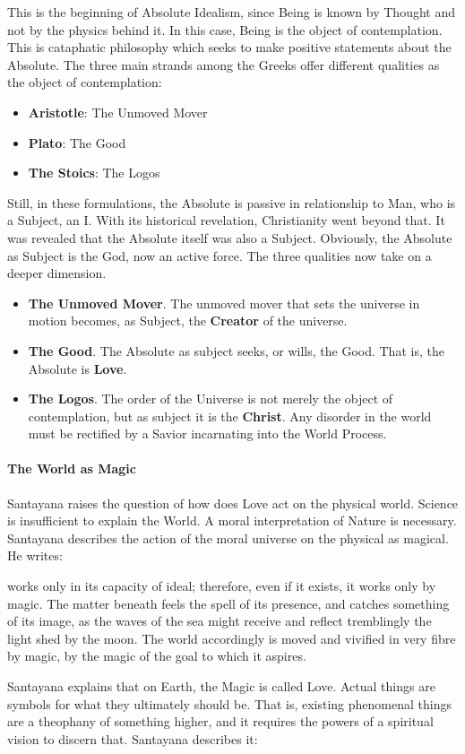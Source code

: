 This is the beginning of Absolute Idealism, since Being is known by Thought and not by the physics behind it. In this case, Being is the object of contemplation. This is cataphatic philosophy which seeks to make positive statements about the Absolute. The three main strands among the Greeks offer different qualities as the object of contemplation:

\begin{itemize}
\item \textbf{Aristotle}: The Unmoved Mover 
\item \textbf{Plato}: The Good 
\item \textbf{The Stoics}: The Logos 
\end{itemize}
Still, in these formulations, the Absolute is passive in relationship to Man, who is a Subject, an I. With its historical revelation, Christianity went beyond that. It was revealed that the Absolute itself was also a Subject. Obviously, the Absolute as Subject is the God, now an active force. The three qualities now take on a deeper dimension.

\begin{itemize}
\item \textbf{The Unmoved Mover}. The unmoved mover that sets the universe in motion becomes, as Subject, the \textbf{Creator} of the universe. 
\item \textbf{The Good}. The Absolute as subject seeks, or wills, the Good. That is, the Absolute is \textbf{Love}. 
\item \textbf{The Logos}. The order of the Universe is not merely the object of contemplation, but as subject it is the \textbf{Christ}. Any disorder in the world must be rectified by a Savior incarnating into the World Process. 
\end{itemize}
\paragraph{The World as Magic}
Santayana raises the question of how does Love act on the physical world. Science is insufficient to explain the World. A moral interpretation of Nature is necessary. Santayana describes the action of the moral universe on the physical as magical. He writes:

\begin{quotex}
 works only in its capacity of ideal; therefore, even if it exists, it works only by magic. The matter beneath feels the spell of its presence, and catches something of its image, as the waves of the sea might receive and reflect tremblingly the light shed by the moon. The world accordingly is moved and vivified in very fibre by magic, by the magic of the goal to which it aspires. 

\end{quotex}
Santayana explains that on Earth, the Magic is called Love. Actual things are symbols for what they ultimately should be. That is, existing phenomenal things are a theophany of something higher, and it requires the powers of a spiritual vision to discern that. Santayana describes it:

